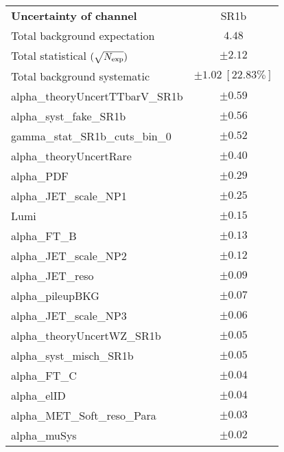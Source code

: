 \begin{table}
\begin{center}
\setlength{\tabcolsep}{0.0pc}
\begin{tabular*}{\textwidth}{@{\extracolsep{\fill}}lc}
\noalign{\smallskip}\hline\noalign{\smallskip}
{\bf Uncertainty of channel}                                    & SR1b            \\
\noalign{\smallskip}\hline\noalign{\smallskip}
Total background expectation             &  $4.48$       \\
\noalign{\smallskip}\hline\noalign{\smallskip}
Total statistical $(\sqrt{N_{\rm exp}})$              & $\pm 2.12$       \\
Total background systematic               & $\pm 1.02\ [22.83\%] $             \\
\noalign{\smallskip}\hline\noalign{\smallskip}
\noalign{\smallskip}\hline\noalign{\smallskip}
alpha\_theoryUncertTTbarV\_SR1b         & $\pm 0.59$       \\
alpha\_syst\_fake\_SR1b         & $\pm 0.56$       \\
gamma\_stat\_SR1b\_cuts\_bin\_0         & $\pm 0.52$       \\
alpha\_theoryUncertRare         & $\pm 0.40$       \\
alpha\_PDF         & $\pm 0.29$       \\
alpha\_JET\_scale\_NP1         & $\pm 0.25$       \\
Lumi         & $\pm 0.15$       \\
alpha\_FT\_B         & $\pm 0.13$       \\
alpha\_JET\_scale\_NP2         & $\pm 0.12$       \\
alpha\_JET\_reso         & $\pm 0.09$       \\
alpha\_pileupBKG         & $\pm 0.07$       \\
alpha\_JET\_scale\_NP3         & $\pm 0.06$       \\
alpha\_theoryUncertWZ\_SR1b         & $\pm 0.05$       \\
alpha\_syst\_misch\_SR1b         & $\pm 0.05$       \\
alpha\_FT\_C         & $\pm 0.04$       \\
alpha\_elID         & $\pm 0.04$       \\
alpha\_MET\_Soft\_reso\_Para         & $\pm 0.03$       \\
alpha\_muSys         & $\pm 0.02$       \\

\end{tabular*}
\end{center}
\end{table}

